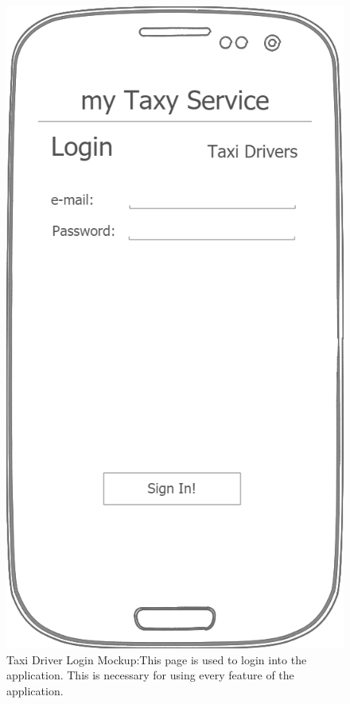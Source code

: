 \documentclass[a4paper]{article}
\begin{document}
\begin{figure}[H]
\includegraphics[width=\mockupWidth]{Mockup-TaxiDriversLogin}
\centering
\caption[Taxi Driver Login Mockup]{Taxi Driver Login Mockup:\newline This page is used to login into the application. This is necessary for using every feature of the application.}
\label{fig:mockuptaxidriverlogin}
\end{figure}
\end{document}
